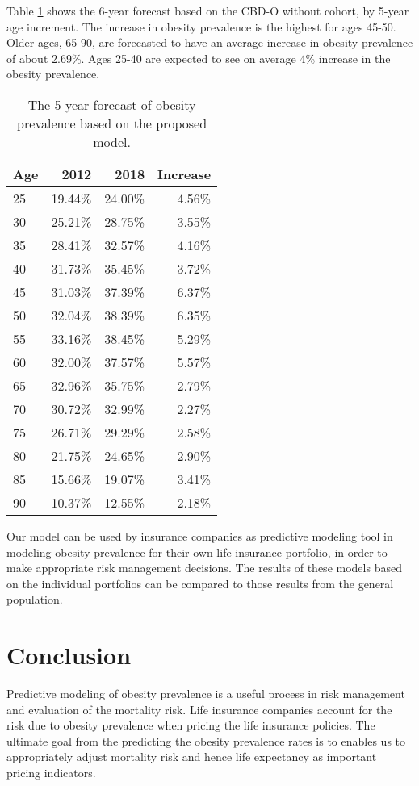 \documentclass[11pt,letterpaper]{article}
\numberwithin{equation}{section}
\begin{document}
Table \ref{forecast} shows the 6-year forecast based on the CBD-O without cohort, by 5-year age increment. The increase in obesity prevalence is the highest for ages 45-50. Older ages, 65-90, are forecasted to have an average increase in obesity prevalence of about 2.69\%. Ages 25-40 are expected to see on average 4\% increase in the obesity prevalence.
\begin{table}[]
\centering
\caption{The 5-year forecast of obesity prevalence based on the proposed model.}
\label{forecast}
\begin{tabular}{lrrr}
\hline\hline
Age &	2012 &	2018 &	   Increase\\
\hline\hline
25 &	19.44\%	& 24.00\%	& 4.56\%\\
30 &	25.21\%	& 28.75\%	& 3.55\% \\
35 &	28.41\%	& 32.57\%	& 4.16\%\\
40 &	31.73\%	& 35.45\%	& 3.72\%\\
45 &	31.03\%	& 37.39\%	&6.37\%\\
50 &	32.04\%	& 38.39\%	&6.35\%\\
55 &	33.16\%	& 38.45\%	&5.29\%\\
60 &	32.00\%	& 37.57\%	&5.57\%\\
65 &	32.96\%	& 35.75\%	&2.79\%\\
70 &	30.72\%	& 32.99\%	   &2.27\%\\
75 &	26.71\%	& 29.29\%	 & 2.58\%\\
80 &	21.75\%	& 24.65\%	 & 2.90\%\\
85 &	15.66\%	& 19.07\%	 & 3.41\%\\
90 &	10.37\%	& 12.55\%	 & 2.18\%\\
\hline\hline
\end{tabular}
\end{table}
Our model can be used by insurance companies as predictive modeling tool in modeling obesity prevalence for their own life insurance portfolio, in order to make appropriate risk management decisions. The results of these models based on the individual portfolios can be compared to those results from the general population.

\section{Conclusion}\label{sec:conclusion}
 Predictive modeling of obesity prevalence is a useful process in risk management and evaluation of the mortality risk. Life insurance companies account for the risk due to obesity prevalence when pricing the life insurance policies. The ultimate goal from the predicting the obesity prevalence rates is to enables us to appropriately adjust mortality risk and hence life expectancy as important pricing indicators.
\end{document}
